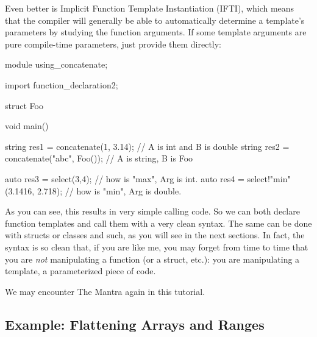 Even better is Implicit Function Template Instantiation (IFTI), which means that the compiler will generally be able to automatically determine a template's parameters by studying the function arguments. If some template arguments are pure compile-time parameters, just provide them directly:

\begin{dcode}
module using_concatenate;

import function_declaration2;

struct Foo {}

void main()
{
    string res1 = concatenate(1, 3.14); // A is int and B is double
    string res2 = concatenate("abc", Foo()); // A is string, B is Foo

    auto res3 = select(3,4); // how is "max", Arg is int.
    auto res4 = select!"min"(3.1416, 2.718); // how is "min", Arg is double.
}
\end{dcode}

As you can see, this results in very simple calling code. So we can both declare function templates and call them with a very clean syntax. The same can be done with structs or classes and such, as you will see in the next sections. In fact, the syntax is so clean that, if you are like me, you may forget from time to time that you are \emph{not} manipulating a function (or a struct, etc.): you are manipulating a template, a parameterized piece of code. 


We may encounter The Mantra again in this tutorial.

\subsection{Example: Flattening Arrays and Ranges}\label{functionflatten}

